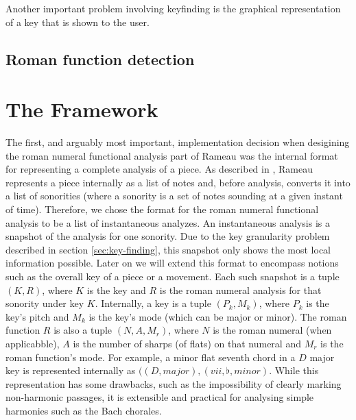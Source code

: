 
Another important problem involving keyfinding is the graphical
representation of a key that is shown to the user.

\subsection{Roman function detection}
\label{sec:roman-funct-detect}



\section{The Framework}
\label{sec:framework}


The first, and arguably most important, implementation decision when
desigining the roman numeral functional analysis part of Rameau was
the internal format for representing a complete analysis of a
piece. As described in \cite{kroger08:rameau}, Rameau represents a
piece internally as a list of notes and, before analysis, converts it
into a list of sonorities (where a sonority is a set of notes sounding
at a given instant of time). Therefore, we chose the format for the
roman numeral functional analysis to be a list of instantaneous
analyzes. An instantaneous analysis is a snapshot of the analysis for
one sonority. Due to the key granularity problem described in section
\ref{sec:key-finding}, this snapshot only shows the most local
information possible. Later on we will extend this format to encompass
notions such as the overall key of a piece or a movement. Each such
snapshot is a tuple $(K,R)$, where $K$ is the key and $R$ is the roman
numeral analysis for that sonority under key $K$. Internally, a key is
a tuple $(P_k,M_k)$, where $P_k$ is the key's pitch and $M_k$ is the
key's mode (which can be major or minor). The roman function $R$ is
also a tuple $(N,A,M_r)$, where $N$ is the roman numeral (when
applicabble), $A$ is the number of sharps (of flats) on that numeral
and $M_r$ is the roman function's mode. For example, a minor flat
seventh chord in a $D$ major key is represented internally as
$((D,major),(vii,\flat,minor)$. While this representation has some
drawbacks, such as the impossibility of clearly marking non-harmonic
passages, it is extensible and practical for analysing simple
harmonies such as the Bach chorales.

